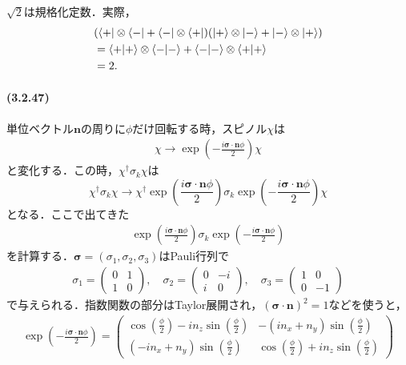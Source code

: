 \documentclass[a4paper]{ltjsreport}
\begin{document}
$\sqrt{2}$は規格化定数．実際，
\begin{align*}
  & (\bra{+} \otimes \bra{-} + \bra{-} \otimes \bra{+}) (\ket{+} \otimes \ket{-} + \ket{-} \otimes \ket{+}) \\
  &= \braket{+|+} \otimes \braket{-|-} + \braket{-|-} \otimes \braket{+|+} \\
  &= 2.
\end{align*}

\paragraph{(3.2.47)}
単位ベクトル$\boldsymbol{n}$の周りに$\phi$だけ回転する時，スピノル$\chi$は
\begin{align}
  \chi\to\exp\left(-\frac{i\boldsymbol{\sigma}\cdot\boldsymbol{n}\phi}{2}\right)\chi
\end{align}
と変化する．この時，$\chi^\dagger\sigma_k\chi$は
\[\chi^\dagger\sigma_k\chi\to\chi^\dagger\exp\left(\frac{i\boldsymbol{\sigma}\cdot\boldsymbol{n}\phi}{2}\right)\sigma_k\exp\left(-\frac{i\boldsymbol{\sigma}\cdot\boldsymbol{n}\phi}{2}\right)\chi\]
となる．ここで出てきた
\begin{align}
  \exp\left(\frac{i\boldsymbol{\sigma}\cdot\boldsymbol{n}\phi}{2}\right)\sigma_k\exp\left(-\frac{i\boldsymbol{\sigma}\cdot\boldsymbol{n}\phi}{2}\right)
\end{align}
を計算する．$\boldsymbol{\sigma}=(\sigma_1,\sigma_2,\sigma_3)$はPauli行列で
\begin{align}
  \sigma_1 =
  \begin{pmatrix}
    0 & 1 \\
    1 & 0
  \end{pmatrix}
  ,\quad\sigma_2 =
  \begin{pmatrix}
    0 & -i \\
    i & 0
  \end{pmatrix}
  ,\quad\sigma_3 =
  \begin{pmatrix}
    1 & 0 \\
    0 & -1
  \end{pmatrix}
  \label{Pauli}
\end{align}
で与えられる．指数関数の部分はTaylor展開され，$(\boldsymbol{\sigma}\cdot\boldsymbol{n})^2=1$などを使うと，
\begin{align}
  \exp\left(-\frac{i\boldsymbol{\sigma}\cdot\boldsymbol{n}\phi}{2}\right) =
  \begin{pmatrix}
    \cos\left(\frac{\phi}{2}\right)-in_z\sin\left(\frac{\phi}{2}\right) & -(in_x+n_y)\sin\left(\frac{\phi}{2}\right) \\
    (-in_x+n_y)\sin\left(\frac{\phi}{2}\right) & \cos\left(\frac{\phi}{2}\right)+in_z\sin\left(\frac{\phi}{2}\right)
  \end{pmatrix}
  \label{exp}
\end{align}
\end{document}
